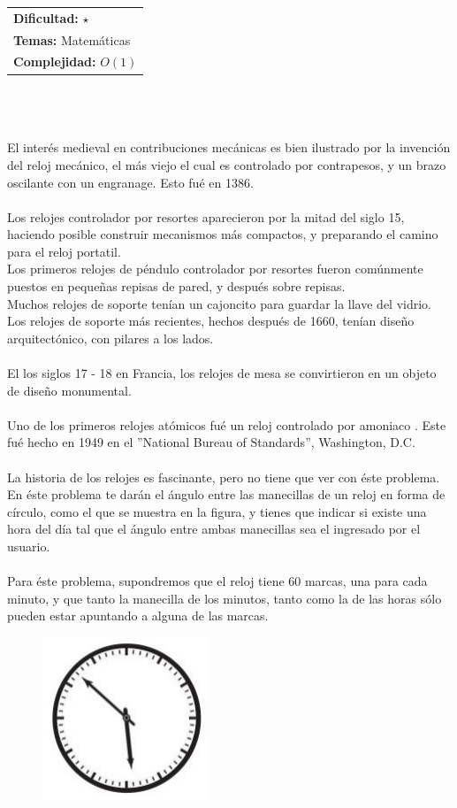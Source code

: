 \documentclass[12pt]{article}
\begin{document}
\hfill
\begin{tabular}{@{}l@{}}
\textbf{Dificultad:} $\star$ \\
\textbf{Temas:} Matemáticas \\
\textbf{Complejidad:} $O(1)$
\end{tabular}\\
\\
\\El interés medieval en contribuciones mecánicas es bien ilustrado por la invención del reloj mecánico, el más viejo el cual es controlado por contrapesos, y un brazo oscilante con un engranage. Esto fué en 1386.\\
\\Los relojes controlador por resortes aparecieron por la mitad del siglo 15, haciendo posible construir mecanismos más compactos, y preparando el camino para el reloj portatil.\\
Los primeros relojes de péndulo controlador por resortes fueron comúnmente puestos en pequeñas repisas de pared, y después sobre repisas. \\Muchos relojes de soporte tenían un cajoncito para guardar la llave del vidrio. Los relojes
de soporte más recientes, hechos después de 1660, tenían diseño arquitectónico, con pilares a los lados.\\
\\El los siglos 17 - 18 en Francia, los relojes de mesa se convirtieron en un objeto de diseño monumental.\\
\\Uno de los primeros relojes atómicos fué un reloj controlado por amoniaco . Este fué hecho en 1949 en el ”National Bureau of Standards”, Washington, D.C.\\
\\La historia de los relojes es fascinante, pero no tiene que ver con éste problema. En éste problema te darán el ángulo entre las manecillas de un reloj en forma de círculo, como el que se muestra en la figura, y tienes que indicar si existe una hora del día tal que el ángulo entre ambas manecillas sea el ingresado por el usuario.\\
\\Para éste problema, supondremos que el reloj tiene 60 marcas, una para cada minuto, y que tanto la manecilla de los minutos, tanto como la de las horas sólo pueden estar apuntando a alguna de las marcas.
\begin{figure}[h!] 
\begin{center} 
\includegraphics[scale = 0.80]{re.PNG}\hspace{50mm}  
\end{center} 
\end{figure}
\end{document}

